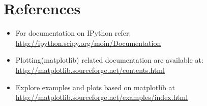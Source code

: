 \documentclass[12pt]{article}
\begin{document}
\section{References}
\begin{itemize}
  \item For documentation on IPython refer: \\ \url{http://ipython.scipy.org/moin/Documentation}
  \item Plotting(matplotlib) related documentation are available at:\\ \url{http://matplotlib.sourceforge.net/contents.html}
  \item Explore examples and plots based on matplotlib at \\ \url{http://matplotlib.sourceforge.net/examples/index.html}
\end{itemize}
\end{document}
